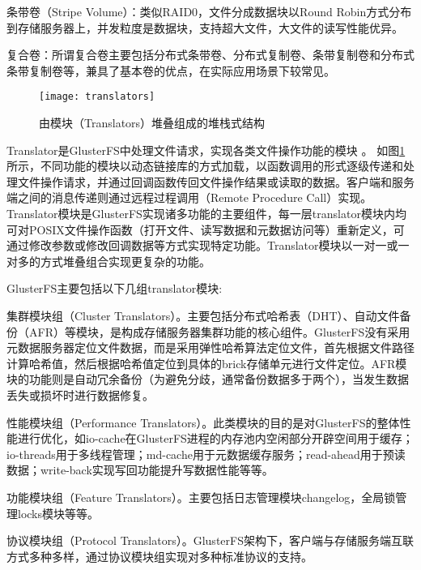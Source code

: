 条带卷（Stripe Volume）：类似RAID0，文件分成数据块以Round Robin方式分布到存储服务器上，并发粒度是数据块，支持超大文件，大文件的读写性能优异。

复合卷：所谓复合卷主要包括分布式条带卷、分布式复制卷、条带复制卷和分布式条带复制卷等，兼具了基本卷的优点，在实际应用场景下较常见。



\begin{figure}[htp]
\centering
\texttt{[image: translators]}
\caption{由模块（Translators）堆叠组成的堆栈式结构}
\label{fig:translators}
\end{figure}
Translator是GlusterFS中处理文件请求，实现各类文件操作功能的模块
\cite{BWFS}\cite{DPFS}。
如图\ref{fig:translators}所示，不同功能的模块以动态链接库的方式加载，以函数调用的形式逐级传递和处理文件操作请求，并通过回调函数传回文件操作结果或读取的数据。客户端和服务端之间的消息传递则通过远程过程调用（Remote Procedure Call）实现。
Translator模块是GlusterFS实现诸多功能的主要组件，每一层translator模块内均可对POSIX文件操作函数（打开文件、读写数据和元数据访问等）重新定义，可通过修改参数或修改回调数据等方式实现特定功能。Translator模块以一对一或一对多的方式堆叠组合实现更复杂的功能。

GlusterFS主要包括以下几组translator模块:

集群模块组（Cluster Translators）。主要包括分布式哈希表（DHT）、自动文件备份（AFR）等模块，是构成存储服务器集群功能的核心组件。GlusterFS没有采用元数据服务器定位文件数据，而是采用弹性哈希算法定位文件，首先根据文件路径计算哈希值，然后根据哈希值定位到具体的brick存储单元进行文件定位。AFR模块的功能则是自动冗余备份（为避免分歧，通常备份数据多于两个），当发生数据丢失或损坏时进行数据修复。

性能模块组（Performance Translators）。此类模块的目的是对GlusterFS的整体性能进行优化，如io-cache在GlusterFS进程的内存池内空闲部分开辟空间用于缓存；io-threads用于多线程管理；md-cache用于元数据缓存服务；read-ahead用于预读数据；write-back实现写回功能提升写数据性能等等。

功能模块组（Feature Translators）。主要包括日志管理模块changelog，全局锁管理locks模块等等。

协议模块组（Protocol Translators）。GlusterFS架构下，客户端与存储服务端互联方式多种多样，通过协议模块组实现对多种标准协议的支持。


